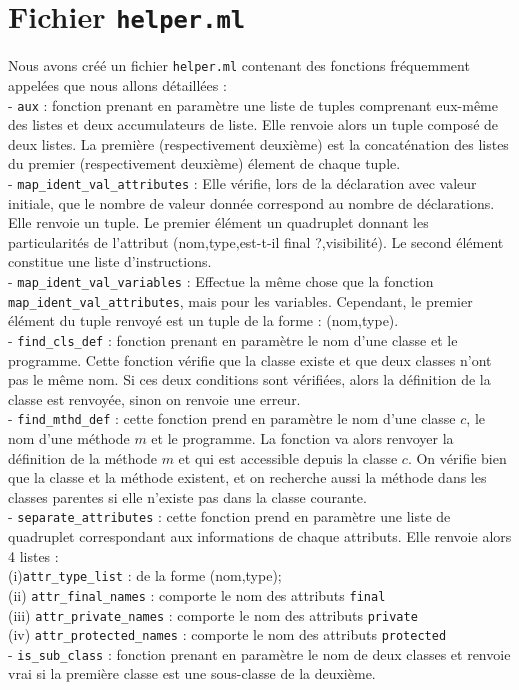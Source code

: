 \documentclass{article}
\begin{document}
\section{Fichier \texttt{helper.ml}}
Nous avons créé un fichier \texttt{helper.ml} contenant des fonctions fréquemment appelées que nous allons détaillées :  
\smallskip\\
- \texttt{aux} : fonction prenant en paramètre une liste de tuples comprenant eux-même des listes et deux accumulateurs de liste. Elle renvoie alors un tuple composé de deux listes. La première (respectivement deuxième) est la concaténation des listes du premier (respectivement deuxième) élement de chaque tuple. 
\medskip\\
- \texttt{map\_ident\_val\_attributes} : Elle vérifie, lors de la déclaration avec valeur initiale, que le nombre de valeur donnée correspond au nombre de déclarations. Elle renvoie un tuple. Le premier élément un quadruplet donnant les particularités de l'attribut (nom,type,est-t-il final ?,visibilité). Le second élément constitue une liste d'instructions.  
\medskip\\
- \texttt{map\_ident\_val\_variables} : Effectue la même chose que la fonction \texttt{map\_ident\_val\_attributes}, mais pour les variables. Cependant, le premier élément du tuple renvoyé est un tuple de la forme : (nom,type). \medskip\\
- \texttt{find\_cls\_def} : fonction prenant en paramètre le nom d'une classe et le programme. Cette fonction vérifie que la classe existe et que deux classes n'ont pas le même nom. Si ces deux conditions sont vérifiées, alors la définition de la classe est renvoyée, sinon on renvoie une erreur. 
\medskip\\
- \texttt{find\_mthd\_def} : cette fonction prend en paramètre le nom d'une classe $c$, le nom d'une méthode $m$ et le programme. La fonction va alors renvoyer la définition de la méthode $m$ et qui est accessible depuis la classe $c$. On vérifie bien que la classe et la méthode existent, et on recherche aussi la méthode dans les classes parentes si elle n'existe pas dans la classe courante.
\medskip\\
- \texttt{separate\_attributes} : cette fonction prend en paramètre une liste de quadruplet correspondant aux informations de chaque attributs. Elle renvoie alors 4 listes : \\
(i)\hspace{0.5cm}\texttt{attr\_type\_list} : de la forme (nom,type);\\
(ii)\hspace{0.3cm} \texttt{attr\_final\_names} : comporte le nom des attributs \texttt{final}\\
(iii)\hspace{0.2cm} \texttt{attr\_private\_names} : comporte le nom des attributs \texttt{private}\\
(iv)\hspace{0.2cm} \texttt{attr\_protected\_names} : comporte le nom des attributs \texttt{protected}
\medskip\\
- \texttt{is\_sub\_class} : fonction prenant en paramètre le nom de deux classes et renvoie vrai si la première classe est une sous-classe de la deuxième.
\end{document}
